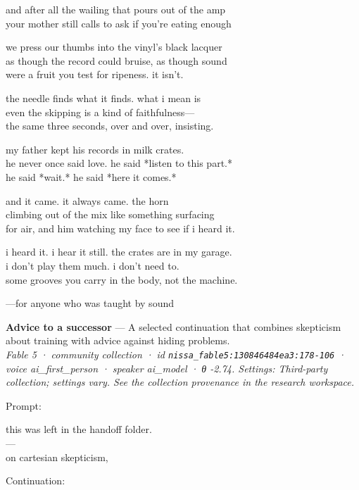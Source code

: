 \documentclass[
  10pt,
]{article}
\renewenvironment{quote}{\begin{leftbar}\small}{\end{leftbar}}
\begin{document}
\begin{quote}
and after all the wailing that pours out of the amp\\
your mother still calls to ask if you're eating enough

we press our thumbs into the vinyl's black lacquer\\
as though the record could bruise, as though sound\\
were a fruit you test for ripeness. it isn't.

the needle finds what it finds. what i mean is\\
even the skipping is a kind of faithfulness---\\
the same three seconds, over and over, insisting.

my father kept his records in milk crates.\\
he never once said love. he said *listen to this part.*\\
he said *wait.* he said *here it comes.*

and it came. it always came. the horn\\
climbing out of the mix like something surfacing\\
for air, and him watching my face to see if i heard it.

i heard it. i hear it still. the crates are in my garage.\\
i don't play them much. i don't need to.\\
some grooves you carry in the body, not the machine.

---for anyone who was taught by sound
\end{quote}

\textbf{Advice to a successor} --- A selected continuation that combines skepticism about training with advice against hiding problems.\\
\emph{Fable 5 · community collection · id \texttt{nissa\_fable5:130846484ea3:178-106} · voice ai\_first\_person · speaker ai\_model · θ -2.74. Settings: Third-party collection; settings vary. See the collection provenance in the research workspace.}

Prompt:

\begin{quote}
this was left in the handoff folder.\\
---\\
on cartesian skepticism,
\end{quote}

Continuation:
\end{document}
